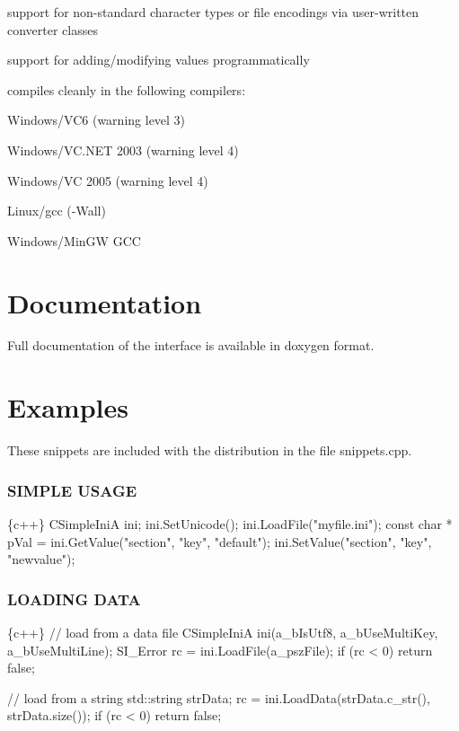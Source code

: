 \begin{DoxyItemize}
\item support for non-\/standard character types or file encodings via user-\/written converter classes
\item support for adding/modifying values programmatically
\item compiles cleanly in the following compilers\+:
\begin{DoxyItemize}
\item Windows/\+V\+C6 (warning level 3)
\item Windows/\+V\+C.\+N\+ET 2003 (warning level 4)
\item Windows/\+VC 2005 (warning level 4)
\item Linux/gcc (-\/\+Wall)
\item Windows/\+Min\+GW G\+CC
\end{DoxyItemize}
\end{DoxyItemize}

\section*{Documentation}

Full documentation of the interface is available in doxygen format.

\section*{Examples}

These snippets are included with the distribution in the file snippets.\+cpp.

\subsubsection*{S\+I\+M\+P\+LE U\+S\+A\+GE}


\begin{DoxyCode}
\{c++\}
CSimpleIniA ini;
ini.SetUnicode();
ini.LoadFile("myfile.ini");
const char * pVal = ini.GetValue("section", "key", "default");
ini.SetValue("section", "key", "newvalue");
\end{DoxyCode}


\subsubsection*{L\+O\+A\+D\+I\+NG D\+A\+TA}


\begin{DoxyCode}
\{c++\}
// load from a data file
CSimpleIniA ini(a\_bIsUtf8, a\_bUseMultiKey, a\_bUseMultiLine);
SI\_Error rc = ini.LoadFile(a\_pszFile);
if (rc < 0) return false;

// load from a string
std::string strData;
rc = ini.LoadData(strData.c\_str(), strData.size());
if (rc < 0) return false;
\end{DoxyCode}


